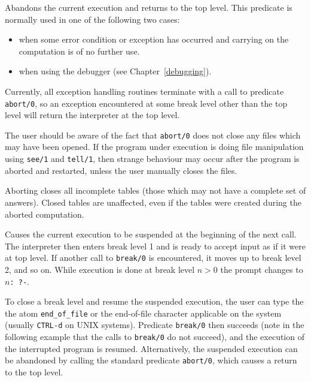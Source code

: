 \begin{description}

    Abandons the current execution and returns to the top level.  This
    predicate is normally used in one of the following two cases: 
    \begin{itemize} 
    \item when some error condition or exception has occurred and carrying
	  on the computation is of no further use.
    \item when using the debugger (see Chapter~\ref{debugging}).  
    \end{itemize}
    Currently, all exception handling routines terminate with a call to 
    predicate {\tt abort/0}, so an exception encountered at some break level 
    other than the top level will return the interpreter at the top level.

    The user should be aware of the fact that {\tt abort/0} does not close 
    any files which may have been opened.  If the program under execution is 
    doing file manipulation using {\tt see/1} and {\tt tell/1}, then strange 
    behaviour may occur after the program is aborted and restarted, unless
    the user manually closes the files.

    Aborting closes all incomplete tables (those which may not have a 
    complete set of answers).  Closed tables are unaffected, even if 
    the tables were created during the aborted computation.

    Causes the current execution to be suspended at the beginning of the next 
    call.  The interpreter then enters break level 1 and is ready to accept
    input as if it were at top level.  If another call to {\tt break/0} is 
    encountered, it moves up to break level 2, and so on.  While execution 
    is done at break level $n>0$ the prompt changes to {\tt $n$: ?-}.

    To close a break level and resume the suspended execution, the user can 
    type the the atom {\tt end\_of\_file} or the end-of-file character 
    applicable on the system (usually {\tt CTRL-d} on UNIX systems).  
    Predicate {\tt break/0} 
    then succeeds (note in the following example that the calls to {\tt break/0}
    do not succeed), and the execution of the interrupted program is resumed.  
    Alternatively, the suspended execution can be abandoned by calling the 
    standard predicate {\tt abort/0}, which causes a return to the top level.


\end{description}

